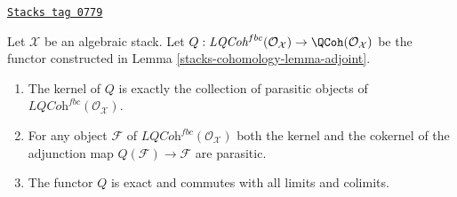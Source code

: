 \begin{lemma}
\label{stacks-cohomology-lemma-adjoint-kernel-parasitic}
\href{https://stacks.math.columbia.edu/tag/0779}{\texttt{Stacks tag 0779}}

Let $\mathcal{X}$ be an algebraic stack.
Let $Q : \textit{LQCoh}^{fbc}(\mathcal{O}_\mathcal{X}) \to
\QCoh(\mathcal{O}_\mathcal{X})$
be the functor constructed in Lemma \ref{stacks-cohomology-lemma-adjoint}.
\begin{enumerate}
\item The kernel of $Q$ is exactly the collection of parasitic objects
of $\textit{LQCoh}^{fbc}(\mathcal{O}_\mathcal{X})$.
\item For any object $\mathcal{F}$
of $\textit{LQCoh}^{fbc}(\mathcal{O}_\mathcal{X})$ both the kernel and the
cokernel of the
adjunction map $Q(\mathcal{F}) \to \mathcal{F}$ are parasitic.
\item The functor $Q$ is exact and commutes with all limits and colimits.
\end{enumerate}
\end{lemma}

